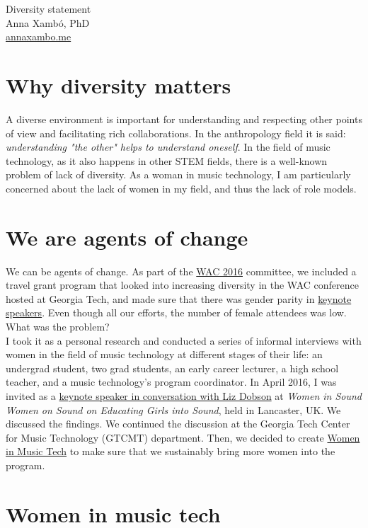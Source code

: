 \documentclass[10pt, a4paper]{article}
\begin{document}
{\LARGE Diversity statement}\\[0.2cm]
Anna Xambó, PhD\\
\href{http://annaxambo.me}{annaxambo.me}

\section*{Why diversity matters}

A diverse environment is important for understanding and respecting other points of view and facilitating rich collaborations. In the anthropology field it is said: \emph{understanding "the other" helps to understand oneself}. In the field of music technology, as it also happens in other STEM fields, there is a well-known problem of lack of diversity. As a woman in music technology, I am particularly concerned about the lack of women in my field, and thus the lack of role models.

\section*{We are agents of change}

We can be agents of change. As part of the \href{http://webaudio.gatech.edu/}{WAC 2016} committee, we included a travel grant program that looked into increasing diversity in the WAC conference hosted at Georgia Tech, and made sure that there was gender parity in \href{http://webaudio.gatech.edu/keynotes}{keynote speakers}. Even though all our efforts, the number of female attendees was low. What was the problem?\\

I took it as a personal research and conducted a series of informal interviews with women in the field of music technology at different stages of their life: an undergrad student, two grad students, an early career lecturer, a high school teacher, and a music technology's program coordinator. In April 2016, I was invited as a \href{http://wiswos.bitbucket.org/index.html\%3Fp=435.html}{keynote speaker in conversation with Liz Dobson} at \emph{Women in Sound Women on Sound on Educating Girls into Sound}, held in Lancaster, UK. We discussed the findings. We continued the discussion at the Georgia Tech Center for Music Technology (GTCMT) department. Then, we decided to create \href{http://www.gtcmt.gatech.edu/}{Women in Music Tech} to make sure that we sustainably bring more women into the program.

\section*{Women in music tech}
\end{document}
